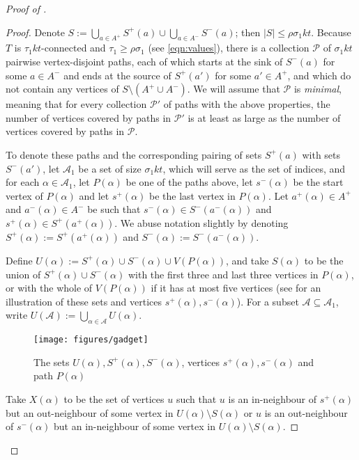 \documentclass[english]{article}
\theoremstyle{plain}
\theoremstyle{remark}
\def\PP{\mathcal{P}}
\def \Sp {S^+}
\def \Sm {S^-}
\def \sp {s^+}
\def \smm {s^-}
\def \Ap {A^+}
\def \Am {A^-}
\def \ap {a^+}
\def \am {a^-}
\newcommand{\sm}{\setminus}
\newcommand{\A}{\mathcal{A}}
\begin{document}
\begin{proof}[Proof of ]
\begin{proof}
			Denote $S := \bigcup_{a \in \Ap} \Sp(a) \cup \bigcup_{a \in \Am} \Sm(a)$; then $|S| \le \rho \sigma_1 kt$.
			Because $T$ is $\tau_1 kt$-connected and $\tau_1 \ge \rho \sigma_1$ (see \eqref{eqn:values}), there is a collection $\PP$ of $\sigma_1 kt$ pairwise vertex-disjoint paths, each of which starts at the sink of $\Sm(a)$ for some $a \in \Am$ and ends at the source of $\Sp(a')$ for some $a' \in \Ap$, and which do not contain any vertices of $S \setminus (\Ap \cup \Am)$. We will assume that $\PP$ is \emph{minimal}, meaning that for every collection $\PP'$ of paths with the above properties, the number of vertices covered by paths in $\PP'$ is at least as large as the number of vertices covered by paths in $\PP$.

			To denote these paths and the corresponding pairing of sets $\Sp(a)$ with sets $\Sm(a')$, let $\A_1$ be a set of size $\sigma_1 kt$, which will serve as the set of indices, and for each $\alpha \in \A_1$, let $P(\alpha)$ be one of the paths above, let $\smm(\alpha)$ be the start vertex of $P(\alpha)$ and let $\sp(\alpha)$ be the last vertex in $P(\alpha)$. Let $\ap(\alpha) \in \Ap$ and $\am(\alpha) \in \Am$ be such that $\smm(\alpha) \in \Sm(\am(\alpha))$ and $\sp(\alpha) \in \Sp(\ap(\alpha))$.
			We abuse notation slightly by denoting $\Sp(\alpha) := \Sp(\ap(\alpha))$ and $\Sm(\alpha) := \Sm(\am(\alpha))$. 


			Define $U(\alpha) := \Sp(\alpha) \cup \Sm(\alpha) \cup V(P(\alpha))$, and take $S(\alpha)$ to be the union of $\Sp(\alpha) \cup \Sm(\alpha)$ with the first three and last three vertices in $P(\alpha)$, or with the whole of $V(P(\alpha))$ if it has at most five vertices (see  for an illustration of these sets and vertices $\sp(\alpha), \smm(\alpha)$).
			For a subset $\A \subseteq \A_1$, write $U(\A) := \bigcup_{\alpha \in \A} U(\alpha)$. 

			\begin{figure}[ht]
				\begin{centering}
					\texttt{[image: figures/gadget]}
					\caption{The sets $U(\alpha), \Sp(\alpha), \Sm(\alpha)$, vertices $\sp(\alpha), \smm(\alpha)$ and path $P(\alpha)$}
					\label{fig:gadget}
				\end{centering}
			\end{figure}

Take $X(\alpha)$ to be the set of vertices $u$ such that $u$ is an in-neighbour of $\sp(\alpha)$ but an out-neighbour of some vertex in $U(\alpha) \sm S(\alpha)$ or $u$ is an out-neighbour of $\smm(\alpha)$ but an in-neighbour of some vertex in $U(\alpha) \sm S(\alpha)$.


\end{proof}
\end{proof}
\end{document}
